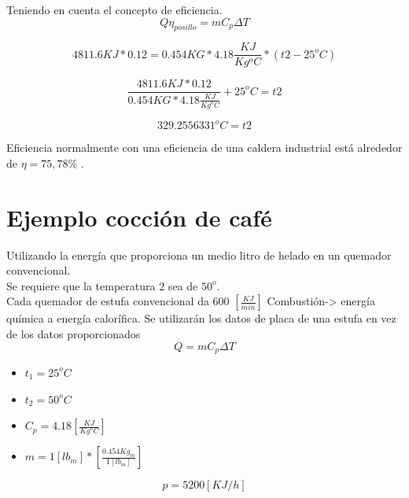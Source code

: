 \documentclass[]{article}
\begin{document}
Teniendo en cuenta el concepto de eficiencia.\\


\begin{equation}
Q \eta_{posillo} =mC_p\Delta T 
\end{equation}

\begin{equation}
4811.6KJ*0.12=0.454KG*4.18\frac{KJ}{Kg^oC}*(t2-25^oC)
\end{equation}


\begin{equation}
\frac{4811.6KJ*0.12}{0.454KG*4.18\frac{KJ}{Kg^oC}}+25^oC=t2
\end{equation}


\begin{equation}
329.2556331^oC=t2
\end{equation}

Eficiencia normalmente con una eficiencia de una caldera industrial está alrededor de $\eta=75,78 \%$ .\\

\section{Ejemplo cocción de café}

Utilizando la energía que proporciona un medio litro de helado en un quemador convencional.\\

Se requiere que la temperatura 2 sea de $50^o$.\\

Cada quemador de estufa convencional da 600 $[\frac{KJ}{min}]$
Combustión-> energía química a energía calorífica. Se utilizarán los datos de placa de una estufa en vez de los datos proporcionados\\


\begin{equation}
Q=mC_p\Delta T
\end{equation}

\begin{itemize}
	\item $t_1=25^oC$
	\item $t_2=50^oC$
	\item $C_p=4.18[\frac{KJ}{Kg^oC}]$
	\item $m=1[lb_m]*[\frac{0.454Kg_m}{1[lb_m]}]$
\end{itemize}


\begin{equation}
p=5200[KJ/h]
\end{equation}
\end{document}
